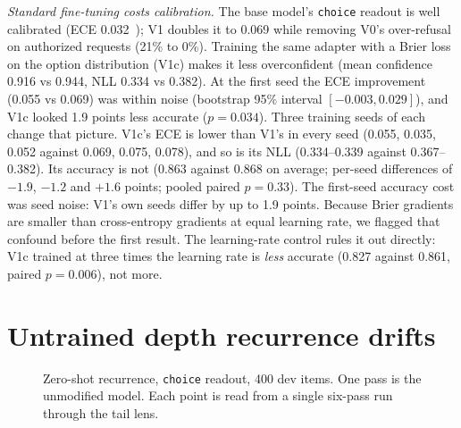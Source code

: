 \documentclass[11pt]{article}
\newcommand{\choiceR}{\texttt{choice}}
\begin{document}
\emph{Standard fine-tuning costs calibration.} The base model's \choiceR{} readout is well calibrated
(ECE 0.032~\cite{guo2017calibration}); V1 doubles it to 0.069 while removing V0's over-refusal on
authorized requests (21\% to 0\%). Training the same adapter with a Brier loss on the option
distribution (V1c) makes it less overconfident (mean confidence 0.916 vs 0.944, NLL 0.334 vs 0.382).
At the first seed the ECE improvement (0.055 vs 0.069) was within noise (bootstrap 95\% interval
$[-0.003,0.029]$), and V1c looked 1.9 points less accurate ($p=0.034$). Three training seeds of each
change that picture. V1c's ECE is lower than V1's in every seed (0.055, 0.035, 0.052 against 0.069,
0.075, 0.078), and so is its NLL (0.334--0.339 against 0.367--0.382). Its accuracy is not
(0.863 against 0.868 on average; per-seed differences of $-1.9$, $-1.2$ and $+1.6$ points; pooled
paired $p=0.33$). The first-seed accuracy cost was seed noise: V1's own seeds differ by up to 1.9
points. Because Brier gradients are smaller than cross-entropy gradients at equal learning rate, we
flagged that confound before the first result. The learning-rate control rules it out
directly: V1c trained at three times the learning rate is \emph{less} accurate (0.827 against
0.861, paired $p=0.006$), not more.

\section{Untrained depth recurrence drifts}
\label{sec:recurrence}

\begin{figure}[t]
\centering
{}
\caption{Zero-shot recurrence, \choiceR{} readout, 400 dev items. One pass is the unmodified model.
Each point is read from a single six-pass run through the tail lens.}
\label{fig:sweep}
\end{figure}
\end{document}
